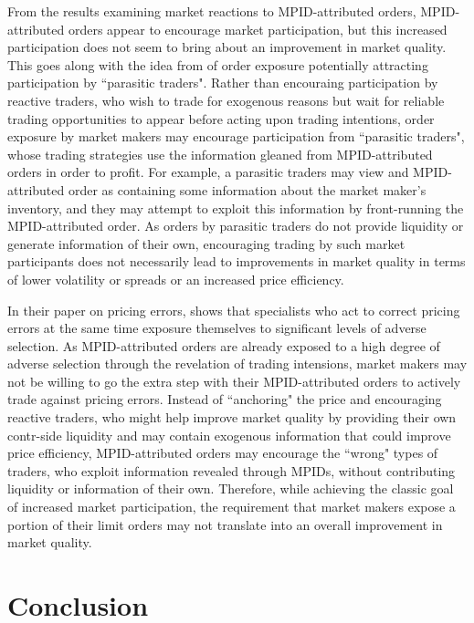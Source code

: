 \documentclass{article}
\begin{document}
From the results examining market reactions to MPID-attributed orders, MPID-attributed orders appear to encourage market participation, but this increased participation does not seem to bring about an improvement in market quality. This goes along with the idea from \citet{harris1997order} of order exposure potentially attracting participation by ``parasitic traders". Rather than encouraing participation by reactive traders, who wish to trade for exogenous reasons but wait for reliable trading opportunities to appear before acting upon trading intentions, order exposure by market makers may encourage participation from ``parasitic traders", whose trading strategies use the information gleaned from MPID-attributed orders in order to profit. For example, a parasitic traders may view and MPID-attributed order as containing some information about the market maker's inventory, and they may attempt to exploit this information by front-running the MPID-attributed order. As orders by parasitic traders do not provide liquidity or generate information of their own, encouraging trading by such market participants does not necessarily lead to improvements in market quality in terms of lower volatility or spreads or an increased price efficiency.

In their paper on pricing errors, \citet{Hendershott2014405} shows that specialists who act to correct pricing errors at the same time exposure themselves to significant levels of adverse selection. As MPID-attributed orders are already exposed to a high degree of adverse selection through the revelation of trading intensions, market makers may not be willing to go the extra step with their MPID-attributed orders to actively trade against pricing errors. Instead of ``anchoring" the price and encouraging reactive traders, who might help improve market quality by providing their own contr-side liquidity and may contain exogenous information that could improve price efficiency, MPID-attributed orders may encourage the ``wrong" types of traders, who exploit information revealed through MPIDs, without contributing liquidity or information of their own. Therefore, while achieving the classic goal of increased market participation, the requirement that market makers expose a portion of their limit orders may not translate into an overall improvement in market quality.

\section{Conclusion}\label{conclusion}
\end{document}
